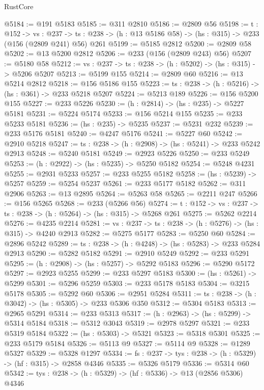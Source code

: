 \begin{lexlean}{RustCore}
\begin{coremodule}
@5184 := @191 @5183
@5185 := @311 @2810
@5186 := @2809 @56
@5198 := {t : @152} ->
  {vs : @237} ->
  {ts : @238} -> (h : @13 @5186 @58) -> (hs : @315) -> @233 (@156 (@2809 @241) @56) @261
@5199 := @5185 @2812
@5200 := @2809 @58
@5202 := @13 @5200 @2812
@5206 := @233 (@156 (@2809 @243) @56)
@5207 := @5180 @58
@5212 := {vs : @237} -> {ts : @238} -> (h : @5202) -> (hs : @315) -> @5206 @5207
@5213 := @5199 @155
@5214 := @2809 @60
@5216 := @13 @5214 @2812
@5218 := @156 @5186 @155
@5223 := {ts : @238} -> (h : @5216) -> (hs : @361) -> @233 @5218 @5207
@5224 := @5213 @189
@5226 := @156 @5200 @155
@5227 := @233 @5226
@5230 := (h : @2814) -> (hs : @235) -> @5227 @5181
@5231 := @5224 @5174
@5233 := @156 @5214 @155
@5235 := @233 @5233 @5181
@5236 := (hs : @235) -> @5235
@5237 := @5231 @232
@5239 := @233 @5176 @5181
@5240 := @4247 @5176
@5241 := @5227 @60
@5242 := @2910 @5218
@5247 := {ts : @238} -> (h : @2908) -> (hs : @5241) -> @233 @5242 @2913
@5248 := @5240 @5181
@5249 := @2923 @5226
@5250 := @233 @5249
@5253 := (h : @2922) -> (hs : @5235) -> @5250 @5182
@5254 := @5248 @4231
@5255 := @2931 @5233
@5257 := @233 @5255 @5182
@5258 := (hs : @5239) -> @5257
@5259 := @5254 @5237
@5261 := @233 @5177 @5182
@5262 := @311 @2906
@5263 := @13 @2895
@5264 := @5263 @58
@5265 := @2211 @247
@5266 := @156 @5265
@5268 := @233 (@5266 @56)
@5274 := {t : @152} -> {vs : @237} -> {ts : @238} -> (h : @5264) -> (hs : @315) -> @5268 @261
@5275 := @5262 @2214
@5276 := @4235 @2214
@5281 := {vs : @237} -> {ts : @238} -> (h : @5276) -> (hs : @315) -> @4240 @2913
@5282 := @5275 @5177
@5283 := @5250 @60
@5284 := @2896 @5242
@5289 := {ts : @238} -> (h : @4248) -> (hs : @5283) -> @233 @5284 @2913
@5290 := @5282 @5182
@5291 := @2910 @5249
@5292 := @233 @5291
@5295 := (h : @2908) -> (hs : @5257) -> @5292 @5183
@5296 := @5290 @5172
@5297 := @2923 @5255
@5299 := @233 @5297 @5183
@5300 := (hs : @5261) -> @5299
@5301 := @5296 @5259
@5303 := @233 @5178 @5183
@5304 := @3215 @5178
@5305 := @5292 @60
@5306 := @2951 @5284
@5311 := {ts : @238} -> (h : @3042) -> (hs : @5305) -> @233 @5306 @350
@5312 := @5304 @5183
@5313 := @2965 @5291
@5314 := @233 @5313
@5317 := (h : @2963) -> (hs : @5299) -> @5314 @5184
@5318 := @5312 @3043
@5319 := @2978 @5297
@5321 := @233 @5319 @5184
@5322 := (hs : @5303) -> @5321
@5323 := @5318 @5301
@5325 := @233 @5179 @5184
@5326 := @5113 @9
@5327 := @5114 @9
@5328 := @1289 @5327
@5329 := @5328 @1297
@5334 := {fs : @237} -> {tys : @238} -> (h : @5329) -> (hf : @315) -> @2858 @4346
@5335 := @5326 @5179
@5336 := @5314 @60
@5342 := {tys : @238} -> (h : @5329) -> (hf : @5336) -> @13 (@2856 @5306) @4346

\end{coremodule}
\end{lexlean}
